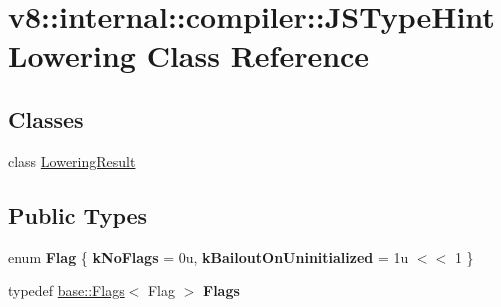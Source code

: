 \hypertarget{classv8_1_1internal_1_1compiler_1_1JSTypeHintLowering}{}\section{v8\+:\+:internal\+:\+:compiler\+:\+:J\+S\+Type\+Hint\+Lowering Class Reference}
\label{classv8_1_1internal_1_1compiler_1_1JSTypeHintLowering}
\subsection*{Classes}
\begin{DoxyCompactItemize}
\item 
class \mbox{\hyperlink{classv8_1_1internal_1_1compiler_1_1JSTypeHintLowering_1_1LoweringResult}{Lowering\+Result}}
\end{DoxyCompactItemize}
\subsection*{Public Types}
\begin{DoxyCompactItemize}
\item 
\mbox{\label{classv8_1_1internal_1_1compiler_1_1JSTypeHintLowering_ad076303c132fb3a18fbb3ba364d88ba7}} 
enum {\bfseries Flag} \{ {\bfseries k\+No\+Flags} = 0u, 
{\bfseries k\+Bailout\+On\+Uninitialized} = 1u $<$$<$ 1
 \}
\item 
\mbox{\label{classv8_1_1internal_1_1compiler_1_1JSTypeHintLowering_aa9d143a358d0c29088a93c7f56cc2192}} 
typedef \mbox{\hyperlink{classv8_1_1base_1_1Flags}{base\+::\+Flags}}$<$ Flag $>$ {\bfseries Flags}
\end{DoxyCompactItemize}
